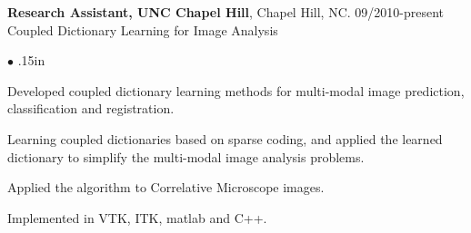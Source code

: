 \documentclass[line,margin]{res}
\newenvironment{bullets}{\begin{list}{\tiny$\bullet$}{\topsep 0pt \itemsep -2pt \leftmargin .15in}}{\vspace*{4pt}\end{list}}
\begin{document}
\begin{resume}
\textbf{Research Assistant, UNC Chapel Hill}, Chapel Hill, NC.  \hfill      09/2010-present \\
Coupled Dictionary Learning for Image Analysis %
\begin{bullets}
\item Developed coupled dictionary learning methods for multi-modal image prediction, classification and registration.
\item Learning coupled dictionaries based on sparse coding, and applied the learned dictionary to simplify the multi-modal image analysis problems.
\item Applied the algorithm to Correlative Microscope images.
\item Implemented in VTK, ITK, matlab and C++.
\end{bullets}
\vspace{-.1in}


\end{resume}
\end{document}

